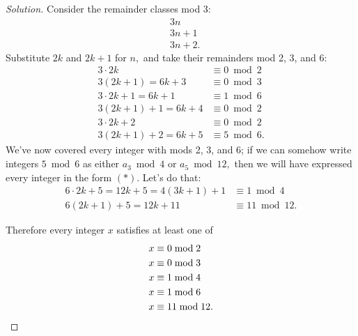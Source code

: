 \documentclass[17pt]{extarticle}
\theoremstyle{plain}
\theoremstyle{definition}
\theoremstyle{remark}
\newenvironment{solution}{\begin{proof}[Solution]}{\end{proof}}
\newcommand{\0}{\varnothing}
\newcommand{\<}{\langle}
\renewcommand{\>}{\rangle}
\begin{document}
\begin{solution}
Consider the remainder classes mod 3: \begin{align*}
  & 3 n \\
  & 3 n + 1 \\
  & 3 n + 2.
\end{align*}
Substitute $ 2k $ and $ 2k + 1 $ for $ n, $ and take their remainders mod 2, 3, and 6: \begin{align*}
3 \cdot 2 k &\equiv 0 \bmod 2 \\
3 (2k + 1) = 6k + 3 &\equiv 0 \bmod 3 \\
3 \cdot 2k + 1 = 6k + 1 &\equiv 1 \bmod 6 \\
3 (2k + 1) + 1 = 6k + 4 &\equiv 0 \bmod 2 \\
3 \cdot 2k + 2 &\equiv 0 \bmod 2 \\
3 (2k + 1) + 2 = 6k + 5 &\equiv 5 \bmod 6.
\end{align*}
We've now covered every integer with mods 2, 3, and 6; if we can somehow write integers $ 5 \bmod 6 $ as either $ a_3 \bmod 4 $ or $ a_5 \bmod 12, $ then we will have expressed every integer in the form $(*).$ Let's do that: \begin{align*}
6 \cdot 2k + 5 = 12k + 5 = 4(3k + 1) + 1 &\equiv 1 \bmod 4 \\
6(2k + 1) + 5 = 12k + 11 &\equiv 11 \bmod 12.
\end{align*}

Therefore every integer $ x $ satisfies at least one of
\begin{align*}
  x &\equiv 0 \bmod 2 \\
  x &\equiv 0 \bmod 3 \\
  x &\equiv 1 \bmod 4 \\
  x &\equiv 1 \bmod 6 \\
  x &\equiv 11 \bmod 12. \qedhere
\end{align*}
\end{solution}
\end{document}
